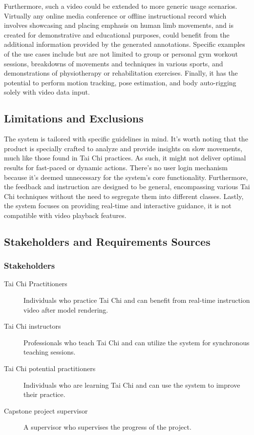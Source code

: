\documentclass[12pt]{article}
\begin{document}
Furthermore, such a video could be extended to more generic usage scenarios. Virtually any online media conference or offline instructional record which involves showcasing and placing emphasis on human limb movements, and is created for demonstrative and educational purposes, could benefit from the additional information provided by the generated annotations. Specific examples of the use cases include but are not limited to group or personal gym workout sessions, breakdowns of movements and techniques in various sports, and demonstrations of physiotherapy or rehabilitation exercises. Finally, it has the potential to perform motion tracking, pose estimation, and body auto-rigging solely with video data input.

\subsection{Limitations and Exclusions}
The system is tailored with specific guidelines in mind. It's worth noting that the product is specially crafted to analyze and provide insights on slow movements, much like those found in Tai Chi practices. As such, it might not deliver optimal results for fast-paced or dynamic actions. There's no user login mechanism because it's deemed unnecessary for the system's core functionality. Furthermore, the feedback and instruction are designed to be general, encompassing various Tai Chi techniques without the need to segregate them into different classes. Lastly, the system focuses on providing real-time and interactive guidance, it is not compatible with video playback features.

\subsection{Stakeholders and Requirements Sources}
\subsubsection{Stakeholders}
\begin{description}
    \item[Tai Chi Practitioners] Individuals who practice Tai Chi and can benefit from real-time instruction video after model rendering.
    \item[Tai Chi instructors] Professionals who teach Tai Chi and can utilize the system for synchronous teaching sessions.
    \item[Tai Chi potential practitioners] Individuals who are learning Tai Chi and can use the system to improve their practice.
    \item[Capstone project supervisor] A supervisor who supervises the progress of the project.
\end{description}
\end{document}
